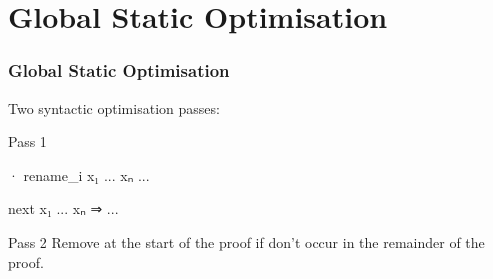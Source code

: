\section{Global Static Optimisation}

\begin{frame}[fragile]
  \frametitle{Global Static Optimisation}

  Two syntactic optimisation passes:

  \begin{block}{Pass 1}
    \medskip
    \begin{minipage}{.4\textwidth}
      \begin{leancode}
        · rename_i x₁ ... xₙ
          ...
      \end{leancode}
    \end{minipage}
    \Longrightarrow
    \begin{minipage}{.4\textwidth}
      \begin{leancode}
        next x₁ ... xₙ ⇒ ...
      \end{leancode}
    \end{minipage}
  \end{block}

  \pause

  \begin{block}{Pass 2}
    Remove  at the start of the proof if  don't occur in the remainder of the proof.
  \end{block}
\end{frame}

\begin{frame}
\end{frame}


